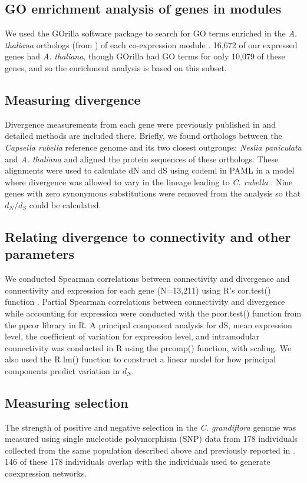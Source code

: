 \subsection{GO enrichment analysis of genes in modules}
We used the GOrilla software package to search for GO terms enriched in the \textit{A. thaliana} orthologs (from \citealt{Williamson2014-tf}) of each co-expression module \citep{Eden2009-hl}. 16,672 of our expressed genes had \textit{A. thaliana}, though GOrilla had GO terms for only 10,079 of these genes, and so the enrichment analysis is based on this subset.

\subsection{Measuring divergence}
Divergence measurements from each gene were previously published in \citep{Williamson2014-tf} and detailed methods are included there. Briefly, we found orthologs between the \textit{Capsella rubella} reference genome and its two closest outgroups: \textit{Neslia paniculata} and \textit{A. thaliana} and aligned the protein sequences of these orthologs. These alignments were used to calculate dN and dS using codeml in PAML in a model where divergence was allowed to vary in the lineage leading to \textit{C. rubella} \citep{Yang2007-rs}. Nine genes with zero synonymous substitutions were removed from the analysis so that $d_{N}/d_{S}$ could be calculated.

\subsection{Relating divergence to connectivity and other parameters}
We conducted Spearman correlations between connectivity and divergence and connectivity and expression for each gene (N=13,211) using R’s cor.test() function \citep{r}. Partial Spearman correlations between connectivity and divergence while accounting for expression were conducted with the pcor.test() function from the ppcor library in R. A principal component analysis for dS, mean expression level, the coefficient of variation for expression level, and intramodular connectivity was conducted in R using the prcomp() function, with scaling. We also used the R lm() function to construct a linear model for how principal components predict variation in $d_{N}$.

\subsection{Measuring selection}
The strength of positive and negative selection in the \textit{C. grandiflora} genome was measured using single nucleotide polymorphism (SNP) data from 178 individuals collected from the same population described above and previously reported in \citep{Josephs2015-nx,Sicard2015-uc}. 146 of these 178 individuals overlap with the individuals used to generate coexpression networks.

